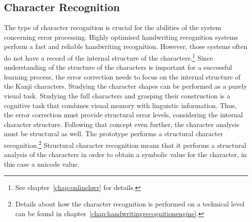 \subsection{Character Recognition}
\label{sec:concept:characterrecognition}

The type of character recognition is crucial for the abilities of the system 
concerning error processing. Highly optimised handwriting recognition systems
perform a fast and reliable handwriting recognition. However, those systems
often do not have a  record of the internal structure of the 
characters.\footnote{See chapter~\ref{chap:onlinehwr} for details.}
Since understanding of the structure of the characters is important for a 
successful learning process, the error correction needs to focus on the internal
structure of the Kanji characters. Studying the character shapes can be 
performed as a purely visual task. Studying the full characters and grasping
their construction is a cognitive task that combines visual memory with
linguistic information. Thus, the error correction must provide structural
error levels, considering the internal character structure. Following that
concept even further, the character analysis must be structural as well.
The prototype performs a structural character 
recognition.\footnote{Details about how the character recognition is
performed on a technical level can be found in 
chapter~\ref{chap:handwritingrecognitionengine}.}
Structural character recognition means that it performs a structural analysis
of the characters in order to obtain a symbolic value for the character,
in this case a unicode value. 







